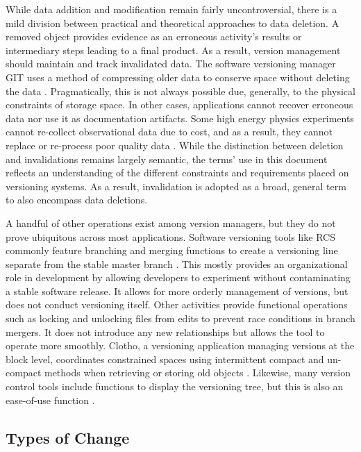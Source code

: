 While data addition and modification remain fairly uncontroversial, there is a mild division between practical and theoretical approaches to data deletion.
A removed object provides evidence as an erroneous activity's results or intermediary steps leading to a final product.
As a result, version management should maintain and track invalidated data.
The software versioning manager GIT uses a method of compressing older data to conserve space without deleting the data \cite{Chacon:2009:PG:1618548}.
Pragmatically, this is not always possible due, generally, to the physical constraints of storage space.
In other cases, applications cannot recover erroneous data nor use it as documentation artifacts.
Some high energy physics experiments cannot re-collect observational data due to cost, and as a result, they cannot replace or re-process poor quality data \cite{Cavanaugh2002}.
While the distinction between deletion and invalidations remains largely semantic, the terms' use in this document reflects an understanding of the different constraints and requirements placed on versioning systems.
As a result, invalidation is adopted as a broad, general term to also encompass data deletions.

A handful of other operations exist among version managers, but they do not prove ubiquitous across most applications.
Software versioning tools like RCS commonly feature branching and merging functions to create a versioning line separate from the stable master branch \cite{tichy1985rcs}.
This mostly provides an organizational role in development by allowing developers to experiment without contaminating a stable software release.
It allows for more orderly management of versions, but does not conduct versioning itself.
Other activities provide functional operations such as locking and unlocking files from edits to prevent race conditions in branch mergers.
It does not introduce any new relationships but allows the tool to operate more smoothly.
Clotho, a versioning application managing versions at the block level, coordinates constrained spaces using intermittent compact and un-compact methods when retrieving or storing old objects \cite{Flouris04clotho:transparent}.
Likewise, many version control tools include functions to display the versioning tree, but this is also an ease-of-use function \cite{Dijkstra1994}.


\subsection{Types of Change}


